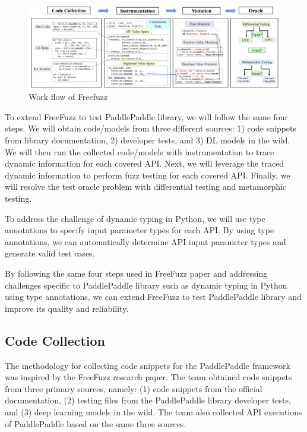 \documentclass[sigconf]{acmart}
\begin{document}
\begin{figure}[h]
  \centering
  \includegraphics[width=\linewidth]{1.png}
  \caption{Work flow of Freefuzz}
\end{figure}

To extend FreeFuzz to test PaddlePaddle library, we will follow the same four steps. We will obtain code/models from three different sources: 1) code snippets from library documentation, 2) developer tests, and 3) DL models in the wild. We will then run the collected code/models with instrumentation to trace dynamic information for each covered API. Next, we will leverage the traced dynamic information to perform fuzz testing for each covered API. Finally, we will resolve the test oracle problem with differential testing and metamorphic testing.

To address the challenge of dynamic typing in Python, we will use type annotations to specify input parameter types for each API. By using type annotations, we can automatically determine API input parameter types and generate valid test cases.

By following the same four steps used in FreeFuzz paper and addressing challenges specific to PaddlePaddle library such as dynamic typing in Python using type annotations, we can extend FreeFuzz to test PaddlePaddle library and improve its quality and reliability.
  
  \subsection{Code Collection}
  \par The methodology for collecting code snippets for the PaddlePaddle framework was inspired by the FreeFuzz research paper. 
  The team obtained code snippets from three primary sources, namely: (1) code snippets from the official documentation, 
  (2) testing files from the PaddlePaddle library developer tests, and (3) deep learning models in the wild. 
  The team also collected API executions of PaddlePaddle based on the same three sources.
\end{document}

